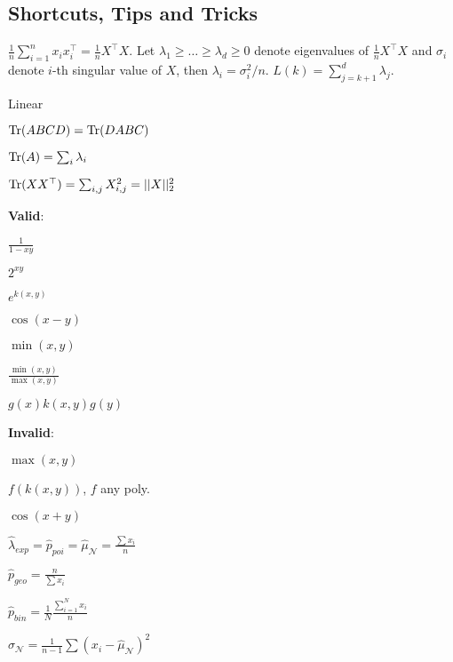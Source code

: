 \subsection{Shortcuts, Tips and Tricks}
\begin{definition}
  \(\frac{1}{n}\sum_{i = 1}^n x_i x_i^\top = \frac{1}{n}X^\top X\). Let \(\lambda_1 \geq \ldots \geq \lambda_d \geq 0\) denote eigenvalues of \(\frac{1}{n}X^\top X\) and \(\sigma_i\) denote \(i\)-th singular value of \(X\), then \(\lambda_i = \sigma_i^2/n\). \(L(k) = \sum_{j=k+1}^d \lambda_j\).
\end{definition}

\begin{definition}[Trace \(\tr\)]
  \begin{itemize*}
    \item Linear
    \item \(\operatorname{Tr}(A B C D) = \operatorname{Tr}(D A B C)\)
    \item \(\operatorname{Tr}(A) = \sum_i \lambda_i\)
    \item \(\operatorname{Tr}(XX^\top) = \sum_{i, j} X_{i, j}^2 = ||X||_2^2\)
  \end{itemize*}
\end{definition}

\begin{definition}[Kernels]
  \textbf{Valid}:
  \begin{itemize*}
    \item \(\frac{1}{1 - xy}\)
    \item \(2^{xy}\)
    \item \(e^{k(x, y)}\)
    \item \(\cos(x - y)\) \\
    \item \(\min(x, y)\)
    \item \(\frac{\min(x, y)}{\max(x, y)}\)
    \item \(g(x)k(x, y) g(y)\)
  \end{itemize*}
  \textbf{Invalid}: {\color{red}
  \begin{itemize*}
    \item \(\max(x, y)\)
    \item \(f(k(x, y))\), \(f\) any poly.
    \item \(\cos(x + y)\)
  \end{itemize*}}
\end{definition}

\begin{definition}[MLE]
  \begin{itemize*}
    \item \(\hat{\lambda}_{exp} = \hat{p}_{poi} = \hat{\mu}_{\mathcal{N}} = \frac{\sum x_i}{n}\)
    \item \(\hat{p}_{geo} = \frac{n}{\sum x_i}\)
    \item \(\hat{p}_{bin} = \frac{1}{N}\frac{\sum_{i=1}^N x_i}{n}\)
    \item \(\hat{\sigma}_{\mathcal{N}} = \frac{1}{n-1}\sum(x_i - \hat{\mu}_{\mathcal{N}})^2\)
  \end{itemize*}
\end{definition}
